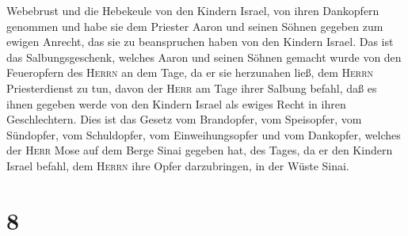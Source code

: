 Webebrust und die Hebekeule von den Kindern Israel, von ihren Dankopfern
genommen und habe sie dem Priester Aaron und seinen Söhnen gegeben zum
ewigen Anrecht, das sie zu beanspruchen haben von den Kindern Israel.
 Das ist das Salbungsgeschenk, welches Aaron und seinen
Söhnen gemacht wurde von den Feueropfern des \textsc{Herrn} an dem Tage,
da er sie herzunahen ließ, dem \textsc{Herrn} Priesterdienst zu tun,
 davon der \textsc{Herr} am Tage ihrer Salbung befahl,
daß es ihnen gegeben werde von den Kindern Israel als ewiges Recht in
ihren Geschlechtern.  Dies ist das Gesetz vom Brandopfer,
vom Speisopfer, vom Sündopfer, vom Schuldopfer, vom Einweihungsopfer und
vom Dankopfer,  welches der \textsc{Herr} Mose auf dem
Berge Sinai gegeben hat, des Tages, da er den Kindern Israel befahl, dem
\textsc{Herrn} ihre Opfer darzubringen, in der Wüste Sinai.

\hypertarget{section-7}{%
\section{8}\label{section-7}}

